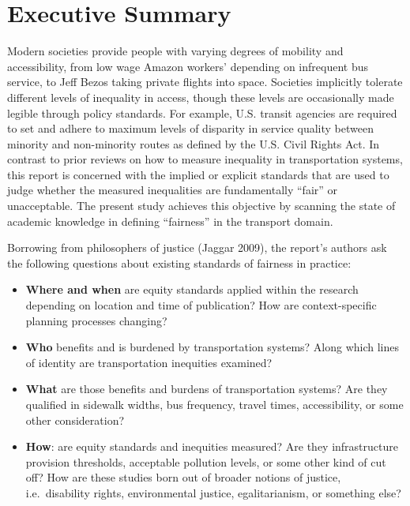 \documentclass[12pt, oneside]{report}
\providecommand{\tightlist}{%
  \setlength{\itemsep}{0pt}\setlength{\parskip}{0pt}}\usepackage{longtable,booktabs,array}
\begin{document}
\newpage\ifdefined\Shaded\renewenvironment{Shaded}{\begin{tcolorbox}[enhanced, interior hidden, borderline west={3pt}{0pt}{shadecolor}, breakable, sharp corners, frame hidden, boxrule=0pt]}{\end{tcolorbox}}\fi

\hypertarget{executive-summary}{%
\section{Executive Summary}\label{executive-summary}}

Modern societies provide people with varying degrees of mobility and
accessibility, from low wage Amazon workers' depending on infrequent bus
service, to Jeff Bezos taking private flights into space. Societies
implicitly tolerate different levels of inequality in access, though
these levels are occasionally made legible through policy standards. For
example, U.S. transit agencies are required to set and adhere to maximum
levels of disparity in service quality between minority and non-minority
routes as defined by the U.S. Civil Rights Act. In contrast to prior
reviews on how to measure inequality in transportation systems, this
report is concerned with the implied or explicit standards that are used
to judge whether the measured inequalities are fundamentally ``fair'' or
unacceptable. The present study achieves this objective by scanning the
state of academic knowledge in defining ``fairness'' in the transport
domain.

Borrowing from philosophers of justice (Jaggar 2009), the report's
authors ask the following questions about existing standards of fairness
in practice:

\begin{itemize}
\tightlist
\item
  \textbf{Where and when} are equity standards applied within the
  research depending on location and time of publication? How are
  context-specific planning processes changing?\\
\item
  \textbf{Who} benefits and is burdened by transportation systems? Along
  which lines of identity are transportation inequities examined?\\
\item
  \textbf{What} are those benefits and burdens of transportation
  systems? Are they qualified in sidewalk widths, bus frequency, travel
  times, accessibility, or some other consideration?\\
\item
  \textbf{How}: are equity standards and inequities measured? Are they
  infrastructure provision thresholds, acceptable pollution levels, or
  some other kind of cut off? How are these studies born out of broader
  notions of justice, i.e.~disability rights, environmental justice,
  egalitarianism, or something else?
\end{itemize}
\end{document}
